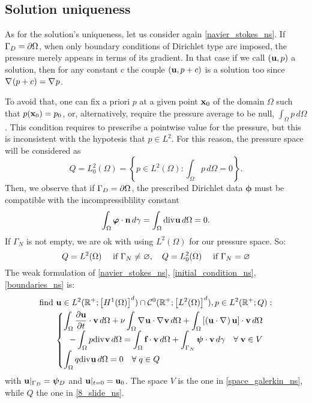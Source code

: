 \subsection{Solution uniqueness}
As for the solution's uniqueness, let us consider again \eqref{navier_stokes_ns}. If \(\Gamma_D = \partial\Omega\), when only boundary conditions of Dirichlet type are imposed, the pressure merely appears in terms of its gradient. In that case if we call \((\textbf{u}, p)\) a solution, then for any constant \(c\) the couple \((\textbf{u}, p+c)\) is a solution too since \(\nabla\mspace{1mu} (p+c) = \nabla\mspace{1mu} p\).

To avoid that, one can fix a priori \(p\) at a given point \(\textbf{x}_0\) of the domain \(\Omega\) such that \(p(\textbf{x}_0) = p_0\), or, alternatively, require the pressure average to be null, \(\int_\Omega p\,d\Omega \). 
This condition requires to prescribe a pointwise value for the pressure, but this is inconsistent with the hypotesis that \(p \in L^2 \). For this reason, the pressure space will be considered as 
\[
    Q = L^2_0(\Omega) = \left\{ p \in L^2(\Omega) : \int_\Omega p \, d\Omega = 0 \right\}.
\]
Then, we observe that if \(\Gamma_D = \partial\Omega\), the prescribed Dirichlet data \(\bm{\phi}\) must be compatible with the incompressiblility constant 
\[
    \int_\Omega \bm{\varphi} \cdot \textbf{n} \, d\gamma = \int_\Omega \text{div}\mspace{1mu} \textbf{u} \, d\Omega = 0.
\]
If \(\Gamma_N\) is not empty, we are ok with using \(L^2(\Omega)\) for our pressure space.
So: 
\begin{equation}
    Q =  L^2(\Omega) \quad \text{ if } \Gamma_N \neq \varnothing, \quad Q = L^2_0(\Omega) \quad \text{ if } \Gamma_N = \varnothing
    \label{8_slide_ns}
\end{equation}
The weak formulation of \eqref{navier_stokes_ns}, \eqref{initial_condition_ns}, \eqref{boundaries_ns} is:
\begin{equation}
    \begin{split}
        \find\uvec \in L^2(\real^+; \left[ H^1(\Omega) \right]^d) \cap \mathcal{C}^0(\real^+;\left[ L^2(\Omega) \right]^d), p \in L^2(\real^+; Q) : \\
        \begin{cases}
            \begin{split}
                \displaystyle \int_\Omega \partialderivative{\uvec}{t} \cdot \vvec \, d\Omega + \nu \int_\Omega \grad \uvec \cdot \grad \vvec \, d\Omega + \int_\Omega \left[ \left( \uvec \cdot \grad \right) \uvec \right] \cdot \vvec \, d\Omega \\
                -\int_\Omega p\div \vvec \, d\Omega = \int_\Omega \vect{f} \cdot \vvec \, d\Omega + \int_{\Gamma_N} \bm{\psi} \cdot \vvec \, d\gamma \quad \forall \; \vvec \in V
            \end{split} \\
            \displaystyle \int_\Omega q \div \uvec \, d\Omega = 0 \quad \forall \; q \in Q
        \end{cases}
    \end{split}
    \label{9_slide_ns}
\end{equation}
with \(\textbf{u}\vert_{\Gamma_D} = \bm{\psi}_D\) and \(\textbf{u}\vert_{t=0} = \textbf{u}_0\). The space \(V\) is the one in \eqref{space_galerkin_ns}, while \(Q\) the one in \eqref{8_slide_ns}.
